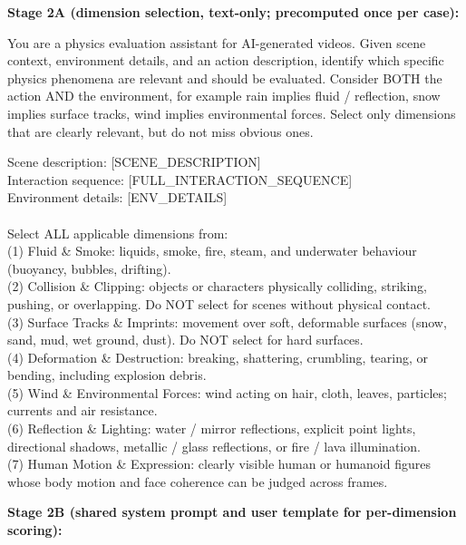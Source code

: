 \documentclass{llmxive}
\begin{document}
\begin{tcolorbox}[d5box, title={Causal Fidelity --- Track 2: Scene-Aware Physics Dimensions (0--3, averaged)}]
\textbf{Stage 2A (dimension selection, text-only; precomputed once per case):}
\begin{tcolorbox}[systemprompt]
You are a physics evaluation assistant for AI-generated videos. Given scene context, environment details, and an action description, identify which specific physics phenomena are relevant and should be evaluated. Consider BOTH the action AND the environment, for example rain implies fluid / reflection, snow implies surface tracks, wind implies environmental forces. Select only dimensions that are clearly relevant, but do not miss obvious ones.
\end{tcolorbox}
\vspace{4pt}
\begin{tcolorbox}[userprompt]
Scene description: [SCENE\_DESCRIPTION]\\
Interaction sequence: [FULL\_INTERACTION\_SEQUENCE]\\
Environment details: [ENV\_DETAILS]\\
\\
Select ALL applicable dimensions from:\\
(1) Fluid \& Smoke: liquids, smoke, fire, steam, and underwater behaviour (buoyancy, bubbles, drifting).\\
(2) Collision \& Clipping: objects or characters physically colliding, striking, pushing, or overlapping. Do NOT select for scenes without physical contact.\\
(3) Surface Tracks \& Imprints: movement over soft, deformable surfaces (snow, sand, mud, wet ground, dust). Do NOT select for hard surfaces.\\
(4) Deformation \& Destruction: breaking, shattering, crumbling, tearing, or bending, including explosion debris.\\
(5) Wind \& Environmental Forces: wind acting on hair, cloth, leaves, particles; currents and air resistance.\\
(6) Reflection \& Lighting: water / mirror reflections, explicit point lights, directional shadows, metallic / glass reflections, or fire / lava illumination.\\
(7) Human Motion \& Expression: clearly visible human or humanoid figures whose body motion and face coherence can be judged across frames.
\end{tcolorbox}
\vspace{6pt}
\textbf{Stage 2B (shared system prompt and user template for per-dimension scoring):}

\end{tcolorbox}
\end{document}
